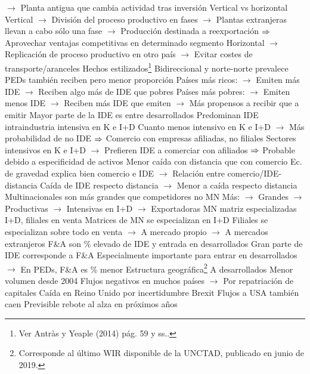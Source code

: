 \documentclass{nuevotema}
\begin{document}
\begin{esquemal}
				\4[] $\to$ Planta antigua que cambia actividad tras inversión
				\4 Vertical vs horizontal
				\4[] Vertical
				\4[] $\to$ División del proceso productivo en fases
				\4[] $\to$ Plantas extranjeras llevan a cabo sólo una fase
				\4[] $\to$ Producción destinada a reexportación
				\4[] $\Rightarrow$ Aprovechar ventajas competitivas en determinado segmento
				\4[] Horizontal
				\4[] $\to$ Replicación de proceso productivo en otro país
				\4[] $\to$ Evitar costes de transporte/aranceles
			\3 Hechos estilizados\footnote{Ver Antràs y Yeaple (2014) pág. 59 y ss..}
				\4[i] Bidireccional y norte-norte prevalece
				\4[] PEDs también reciben pero menor proporción
				\4[] Países más ricos:
				\4[] $\to$ Emiten más IDE
				\4[] $\to$ Reciben algo más de IDE que pobres
				\4[] Países más pobres:
				\4[] $\to$ Emiten menos IDE
				\4[] $\to$ Reciben más IDE que emiten
				\4[] $\to$ Más propensos a recibir que a emitir
				\4[] Mayor parte de la IDE es entre desarrollados
				\4[ii] Predominan IDE intraindustria intensiva en K e I+D
				\4[] Cuanto menos intensivo en K e I+D
				\4[] $\to$ Más probabilidad de no IDE
				\4[] $\Rightarrow$ Comercio con empresas afiliadas, no filiales
				\4[] Sectores intensivos en K e I+D
				\4[] $\to$ Prefieren IDE a comerciar con afiliados
				\4[] $\Rightarrow$ Probable debido a especificidad de activos
				\4[iii] Menor caída con distancia que con comercio
				\4[] Ec. de gravedad explica bien comercio e IDE
				\4[] $\to$ Relación entre comercio/IDE-distancia
				\4[] Caída de IDE respecto distancia
				\4[] $\to$ Menor a caída respecto distancia
				\4[iv] Multinacionales son más grandes que competidores no MN
				\4[] Más:
				\4[] $\to$ Grandes
				\4[] $\to$ Productivas
				\4[] $\to$ Intensivas en I+D
				\4[] $\to$ Exportadoras
				\4[v] MN matriz especializadas I+D, filiales en venta
				\4[] Matrices de MN se especializan en I+D
				\4[] Filiales se especializan sobre todo en venta
				\4[] $\to$ A mercado propio
				\4[] $\to$ A mercados extranjeros
				\4[vi] F\&A son \% elevado de IDE y entrada en desarrollados
				\4[] Gran parte de IDE corresponde a F\&A
				\4[] Especialmente importante para entrar en desarrollados
				\4[] $\to$ En PEDs, F\&A es \% menor
			\3 Estructura geográfica\footnote{Corresponde al último WIR disponible de la UNCTAD, publicado en junio de 2019.}
				\4 A desarrollados
				\4[] Menor volumen desde 2004
				\4[] Flujos negativos en muchos países
				\4[] $\to$ Por repatriación de capitales
				\4[] Caída en Reino Unido por incertidumbre Brexit
				\4[] Flujos a USA también caen
				\4[] Previsible rebote al alza en próximos años

\end{esquemal}
\end{document}
